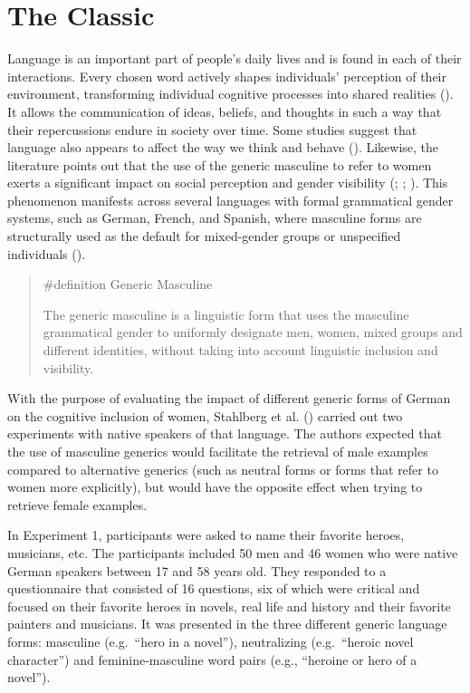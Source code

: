 \documentclass[
  letterpaper,
]{book}
\begin{document}
\section{The Classic}\label{the-classic-15}

Language is an important part of people's daily lives and is found in
each of their interactions. Every chosen word actively shapes
individuals' perception of their environment, transforming individual
cognitive processes into shared realities
(). It allows the
communication of ideas, beliefs, and thoughts in such a way that their
repercussions endure in society over time. Some studies suggest that
language also appears to affect the way we think and behave
(). Likewise, the
literature points out that the use of the generic masculine to refer to
women exerts a significant impact on social perception and gender
visibility (;
;
). This
phenomenon manifests across several languages with formal grammatical
gender systems, such as German, French, and Spanish, where masculine
forms are structurally used as the default for mixed-gender groups or
unspecified individuals ().

\begin{quote}
\label{def-genericmasculine}{\#definition} Generic
Masculine

The generic masculine is a linguistic form that uses the masculine
grammatical gender to uniformly designate men, women, mixed groups and
different identities, without taking into account linguistic inclusion
and visibility.
\end{quote}

With the purpose of evaluating the impact of different generic forms of
German on the cognitive inclusion of women, Stahlberg et al.
() carried out two experiments
with native speakers of that language. The authors expected that the use
of masculine generics would facilitate the retrieval of male examples
compared to alternative generics (such as neutral forms or forms that
refer to women more explicitly), but would have the opposite effect when
trying to retrieve female examples.

In Experiment 1, participants were asked to name their favorite heroes,
musicians, etc. The participants included 50 men and 46 women who were
native German speakers between 17 and 58 years old. They responded to a
questionnaire that consisted of 16 questions, six of which were critical
and focused on their favorite heroes in novels, real life and history
and their favorite painters and musicians. It was presented in the three
different generic language forms: masculine (e.g.~``hero in a novel''),
neutralizing (e.g.~``heroic novel character'') and feminine-masculine
word pairs (e.g., ``heroine or hero of a novel'').
\end{document}
